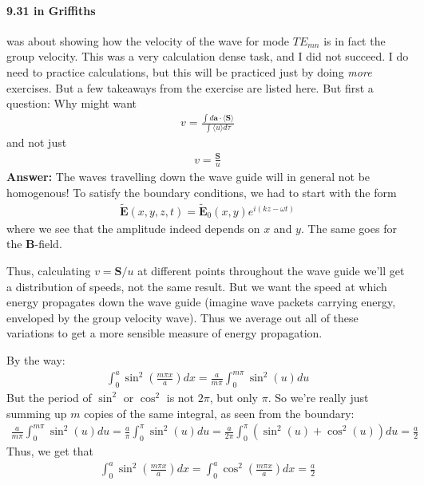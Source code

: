 \paragraph{9.31 in Griffiths} was about showing how the velocity of the wave for mode \(TE_{mn}\) is in fact the group velocity. This was a very calculation dense task, and I did not succeed. I do need to practice calculations, but this will be practiced just by doing \textit{more} exercises. But a few takeaways from the exercise are listed here. But first a question: 
Why might want  \begin{align*}
    v = \frac{\int d \mathbf{a} \cdot \langle \mathbf{S} \rangle }{\int \langle u \rangle d \tau}
\end{align*}
and not just \begin{align*}
    v = \frac{\mathbf{S}}{u}
\end{align*}
\textbf{Answer:} The waves travelling down the wave guide will in general not be homogenous! To satisfy the boundary conditions, we had to start with the form \begin{align*}
    \mathbf{\tilde{E}}(x, y, z, t) = \tilde{\mathbf{E}}_0(x, y)e^{i(kz - \omega t)} 
\end{align*} 
where we see that the amplitude indeed depends on \(x\) and \(y\). The same goes for the \(\mathbf{B}\)-field. 

Thus, calculating \(v = \mathbf{S} / u\) at different points throughout the wave guide we'll get a distribution of speeds, not the same result. But we want the speed at which energy propagates down the wave guide (imagine wave packets carrying energy, enveloped by the group velocity wave). Thus we average out all of these variations to get a more sensible measure of energy propagation.

By the way: \begin{align*}
    \int_0 ^{a} \sin ^{2} \left(\frac{m \pi x}{a}\right)dx = \frac{a}{m \pi } \int_0 ^{m \pi } \sin ^{2} (u) du
\end{align*}
But the period of \(\sin ^{2} \) or \(\cos ^{2} \) is not \(2\pi \), but only \(\pi \). So we're really just summing up \(m\) copies of the same integral, as seen from the boundary: \begin{align*}
    \frac{a}{m \pi } \int_0 ^{m \pi } \sin ^{2} (u) du = \frac{a}{\pi } \int_0 ^{\pi } \sin ^{2} (u) du = \frac{a}{2 \pi } \int_0 ^\pi \left( \sin ^{2} (u) + \cos ^{2} (u) \right)du = \frac{a}{2} 
\end{align*} 
Thus, we get that \begin{align*}
    \boxed{\int_0 ^a \sin ^{2} \left( \frac{m \pi  x}{a} \right) dx = \int_0 ^a \cos ^{2} \left( \frac{m \pi  x}{a} \right) dx = \frac{a}{2}}
\end{align*}
